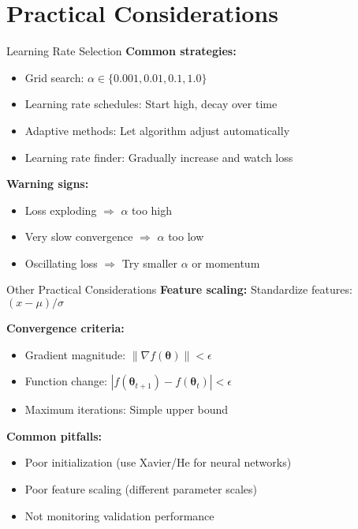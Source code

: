 \documentclass[aspectratio=169,11pt]{beamer}
\newcommand{\grad}{\nabla}
\newcommand{\vtheta}{\bm{\theta}}
\begin{document}
\section{Practical Considerations}

\begin{frame}{Learning Rate Selection}
\textbf{Common strategies:}
\begin{itemize}
\item Grid search: $\alpha \in \{0.001, 0.01, 0.1, 1.0\}$
\item Learning rate schedules: Start high, decay over time
\item Adaptive methods: Let algorithm adjust automatically
\item Learning rate finder: Gradually increase and watch loss
\end{itemize}

\pause
\textbf{Warning signs:}
\begin{itemize}
\item Loss exploding $\Rightarrow$ $\alpha$ too high
\item Very slow convergence $\Rightarrow$ $\alpha$ too low
\item Oscillating loss $\Rightarrow$ Try smaller $\alpha$ or momentum
\end{itemize}
\end{frame}

\begin{frame}{Other Practical Considerations}
\textbf{Feature scaling:} Standardize features: $(x - \mu)/\sigma$

\textbf{Convergence criteria:}
\begin{itemize}
\item Gradient magnitude: $\|\grad f(\vtheta)\| < \epsilon$
\item Function change: $|f(\vtheta_{t+1}) - f(\vtheta_t)| < \epsilon$
\item Maximum iterations: Simple upper bound
\end{itemize}

\pause
\textbf{Common pitfalls:}
\begin{itemize}
\item Poor initialization (use Xavier/He for neural networks)
\item Poor feature scaling (different parameter scales)
\item Not monitoring validation performance
\end{itemize}
\end{frame}
\end{document}
